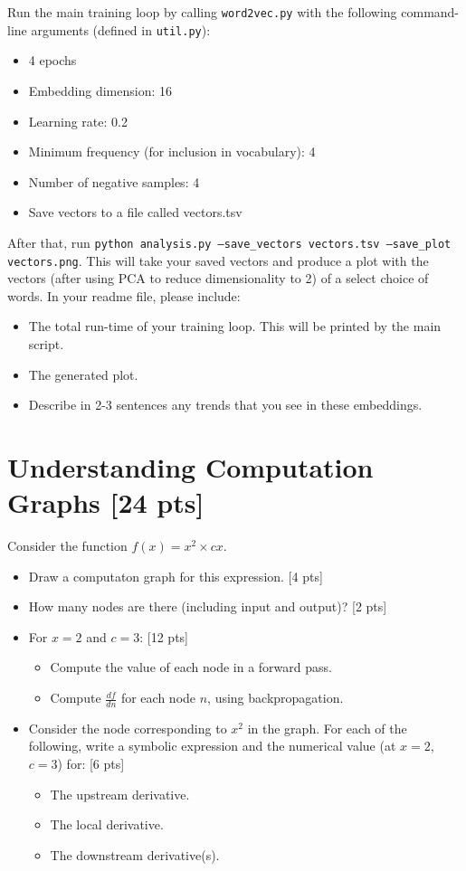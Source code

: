 \documentclass[11pt]{article}
\begin{document}
\vspace{2em}
 Run the main training loop by calling \texttt{word2vec.py} with the following command-line arguments (defined in \texttt{util.py}):
\begin{itemize}
  \item 4 epochs
  \item Embedding dimension: 16
  \item Learning rate: 0.2
  \item Minimum frequency (for inclusion in vocabulary): 4
  \item Number of negative samples: 4
  \item Save vectors to a file called vectors.tsv
\end{itemize}
After that, run \texttt{python analysis.py --save\_vectors vectors.tsv --save\_plot vectors.png}.  This will take your saved vectors and produce a plot with the vectors (after using PCA to reduce dimensionality to 2) of a select choice of words.  In your readme file, please include: 
\begin{itemize}
  \item The total run-time of your training loop.  This will be printed by the main script.
  \item The generated plot.
  \item Describe in 2-3 sentences any trends that you see in these embeddings.
\end{itemize}

\section{Understanding Computation Graphs [24 pts]}

  Consider the function $f(x) = x^2 \times cx$.
\begin{itemize}
  \item Draw a computaton graph for this expression. [4 pts]
  \item How many nodes are there (including input and output)? [2 pts]
  \item For $x = 2$ and $c=3$: [12 pts]
    \begin{itemize}
      \item Compute the value of each node in a forward pass.
      \item Compute $\frac{df}{dn}$ for each node $n$, using backpropagation.
    \end{itemize}
  \item Consider the node corresponding to $x^2$ in the graph.  For each of the following, write a symbolic expression and the numerical value (at $x=2$, $c=3$) for: [6 pts]
    \begin{itemize}
      \item The upstream derivative.
      \item The local derivative.
      \item The downstream derivative(s).
    \end{itemize}
\end{itemize}

\end{document}
